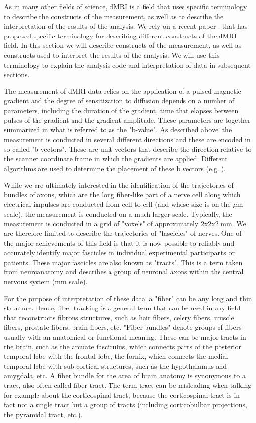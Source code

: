 \documentclass{bioinfo}
\begin{document}
As in many other fields of science, dMRI is a field that uses specific terminology to describe the constructs of the measurement, as well as to describe the interpretation of the results of the analysis. We rely on a recent paper \citep{Cote2013tractometer}, that has proposed specific terminology for describing different constructs of the dMRI field. In this section we will describe constructs of the measurement, as well as constructs used to interpret the results of the analysis. We will use this terminology to explain the analysis code and interpretation of data in subsequent sections. 

The measurement of dMRI data relies on the application of a pulsed magnetic gradient and the degree of sensitization to diffusion depends on a number of parameters, including the duration of the gradient, time that elapses between pulses of the gradient and the gradient amplitude. These parameters are together summarized in what is referred to as the "b-value".  As described above, the measurement is conducted in several different directions and these are encoded in so-called "b-vectors". These are unit vectors that describe the direction relative to the scanner coordinate frame in which the gradients are applied. Different algorithms are used to determine the placement of these b vectors (e.g. \citep{jones-etal:99}).

While we are ultimately interested in the identification of the trajectories of bundles of axons, which are the long fiber-like part of a nerve cell along which electrical impulses are conducted from cell to cell (and whose size is on the $\mu$m scale), the measurement is conducted on a much larger scale. Typically, the measurement is conducted in a grid of "voxels" of approximately 2x2x2 mm. We are therefore limited to describe the trajectories of "fascicles" of nerves. One of the major achievements of this field is that it is now possible to reliably and accurately identify major fascicles in individual experimental participants or patients. These major fascicles are also known as "tracts". This is a term taken from neuroanatomy and describes a group of neuronal axons within the central nervous system (mm scale). 

For the purpose of interpretation of these data, a "fiber" can be any long and thin structure. Hence, fiber tracking is a general term that can be used in any field that reconstructs fibrous structures, such as hair fibers, celery fibers, muscle fibers, prostate fibers, brain fibers, etc. "Fiber bundles" denote groups of fibers usually with an anatomical or functional meaning. These can be major tracts in the brain, such as the arcuate fasciculus, which connects parts of the posterior temporal lobe with the frontal lobe, the fornix, which connects the medial temporal lobe with sub-cortical structures, such as the hypothalamus and amygdala,  etc. A fiber bundle for the area of brain anatomy is synonymous to a tract, also often called fiber tract. The term tract can be misleading when talking for example about the corticospinal tract, because the corticospinal tract is in fact not a single tract but a group of tracts (including corticobulbar projections, the pyramidal tract, etc.).
\end{document}
